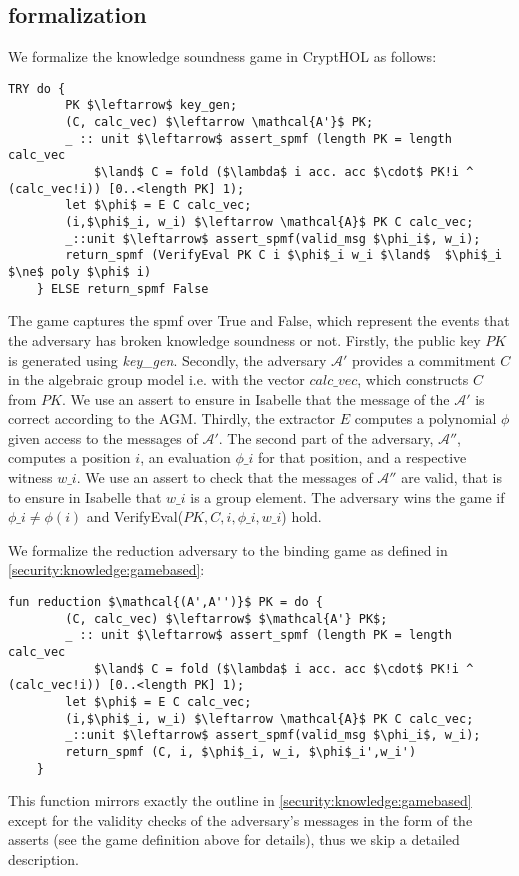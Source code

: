 \subsection{formalization}
We formalize the knowledge soundness game in CryptHOL as follows: 
\begin{lstlisting}[language=isabelle]
    TRY do {
        PK $\leftarrow$ key_gen;
        (C, calc_vec) $\leftarrow \mathcal{A'}$ PK;
        _ :: unit $\leftarrow$ assert_spmf (length PK = length calc_vec 
            $\land$ C = fold ($\lambda$ i acc. acc $\cdot$ PK!i ^ (calc_vec!i)) [0..<length PK] 1);
        let $\phi$ = E C calc_vec;
        (i,$\phi$_i, w_i) $\leftarrow \mathcal{A}$ PK C calc_vec;
        _::unit $\leftarrow$ assert_spmf(valid_msg $\phi_i$, w_i);
        return_spmf (VerifyEval PK C i $\phi$_i w_i $\land$  $\phi$_i $\ne$ poly $\phi$ i)
    } ELSE return_spmf False
\end{lstlisting}
The game captures the spmf over True and False, which represent the events that the adversary has broken knowledge soundness or not.
Firstly, the public key $PK$ is generated using \textit{key\_gen}. 
Secondly, the adversary $\mathcal{A'}$ provides a commitment $C$ in the algebraic group model i.e. with the vector $calc\_vec$, which constructs $C$ from $PK$. We use an assert to ensure in Isabelle that the message of the $\mathcal{A'}$ is correct according to the AGM.
Thirdly, the extractor $E$ computes a polynomial $\phi$ given access to the messages of $\mathcal{A'}$. The second part of the adversary, $\mathcal{A''}$, computes a position $i$, an evaluation $\phi\_i$ for that position, and a respective witness $w\_i$. We use an assert to check that the messages of $\mathcal{A''}$ are valid, that is to ensure in Isabelle that $w\_i$ is a group element.
The adversary wins the game if $\phi\_i \ne \phi(i)$ and VerifyEval($PK,C,i,\phi\_i,w\_i$) hold.

We formalize the reduction adversary to the binding game as defined in \ref{security:knowledge:gamebased}: 
\begin{lstlisting}[language=isabelle]
    fun reduction $\mathcal{(A',A'')}$ PK = do {
        (C, calc_vec) $\leftarrow$ $\mathcal{A'} PK$;
        _ :: unit $\leftarrow$ assert_spmf (length PK = length calc_vec 
            $\land$ C = fold ($\lambda$ i acc. acc $\cdot$ PK!i ^ (calc_vec!i)) [0..<length PK] 1);
        let $\phi$ = E C calc_vec;
        (i,$\phi$_i, w_i) $\leftarrow \mathcal{A}$ PK C calc_vec;
        _::unit $\leftarrow$ assert_spmf(valid_msg $\phi_i$, w_i);
        return_spmf (C, i, $\phi$_i, w_i, $\phi$_i',w_i')
    }
\end{lstlisting}
This function mirrors exactly the outline in \ref{security:knowledge:gamebased} except for the validity checks of the adversary's messages in the form of the asserts (see the game definition above for details), thus we skip a detailed description. 